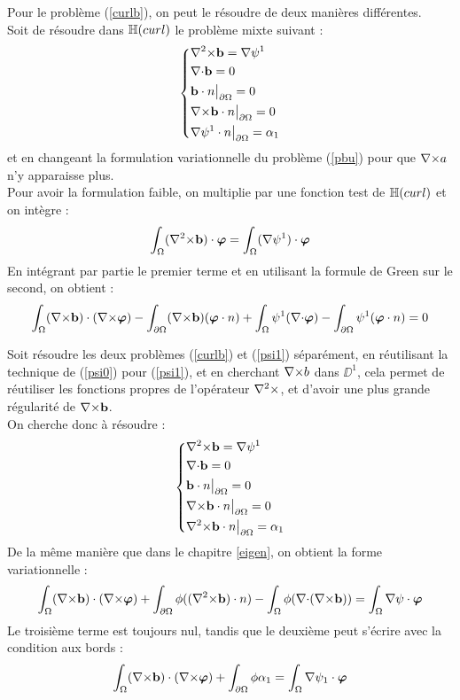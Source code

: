 Pour le problème (\ref{curlb}), on peut le résoudre de deux manières différentes.\\
Soit de résoudre dans ${\mathbb{H}}(curl)$ le problème mixte suivant : 
\begin{equation}
\label{pbbcurl}
\left\{
\begin{aligned}
&{\nabla^2\times} \mathbf{b} = {\nabla}\psi^1\\
&{\nabla\cdot} \mathbf{b} = 0\\
&\mathbf{b}\cdot n{\big\rvert_{\partial\Omega}} = 0\\
&{\nabla\times} \mathbf{b}\cdot n{\big\rvert_{\partial\Omega}} = 0\\
&{\nabla}\psi^1\cdot n{\big\rvert_{\partial\Omega}} = \alpha_1
\end{aligned}
\right.
\end{equation}
et en changeant la formulation variationnelle du problème (\ref{pbu}) pour que ${\nabla\times} a$ n'y apparaisse plus.\\
Pour avoir la formulation faible, on multiplie par une fonction test de ${\mathbb{H}}(curl)$ et on intègre :
\[
\int_\Omega ({\nabla^2\times} \mathbf{b})\cdot\bm{\varphi} = \int_\Omega ({\nabla}\psi^1)\cdot\bm{\varphi}
\]
En intégrant par partie le premier terme et en utilisant la formule de Green sur le second, on obtient :
\begin{equation}
\label{fvbcurl}
\int_\Omega ({\nabla\times} \mathbf{b})\cdot({\nabla\times}\bm{\varphi}) - \int_{\partial\Omega} ({\nabla\times} \mathbf{b})(\bm{\varphi}\cdot n) + \int_\Omega \psi^1({\nabla\cdot}\bm{\varphi}) - \int_{\partial\Omega} \psi^1(\bm{\varphi}\cdot n) = 0
\end{equation}

Soit résoudre les deux problèmes (\ref{curlb}) et (\ref{psi1}) séparément, en réutilisant la technique de (\ref{psi0}) pour (\ref{psi1}), et en cherchant ${\nabla\times} b$ dans $\DD^1$, cela permet de réutiliser les fonctions propres de l'opérateur ${\nabla^2\times}$, et d'avoir une plus grande régularité de ${\nabla\times} \mathbf{b}$.\\
On cherche donc à résoudre :
\[
\left\{
\begin{aligned}
&{\nabla^2\times} \mathbf{b} = {\nabla}\psi^1\\
&{\nabla\cdot} \mathbf{b} = 0\\
&\mathbf{b}\cdot n{\big\rvert_{\partial\Omega}} = 0\\
&{\nabla\times} \mathbf{b}\cdot n{\big\rvert_{\partial\Omega}} = 0\\
&{\nabla^2\times} \mathbf{b}\cdot n{\big\rvert_{\partial\Omega}} = \alpha_1
\end{aligned}
\right.
\]
De la même manière que dans le chapitre \ref{eigen}, on obtient la forme variationnelle :
\[
\int_\Omega ({\nabla\times}\mathbf{b})\cdot({\nabla\times}\bm{\varphi}) + \int_{\partial\Omega} \phi(({\nabla^2\times}\mathbf{b})\cdot n) - \int_\Omega \phi({\nabla\cdot}({\nabla\times} \mathbf{b}))  = \int_\Omega {\nabla}\psi\cdot\bm{\varphi}
\]
Le troisième terme est toujours nul, tandis que le deuxième peut s'écrire avec la condition aux bords :
\begin{equation}
\label{bd1}
\int_\Omega ({\nabla\times}\mathbf{b})\cdot({\nabla\times}\bm{\varphi}) + \int_{\partial\Omega} \phi\alpha_1 = \int_\Omega {\nabla}\psi_1\cdot\bm{\varphi}
\end{equation}

